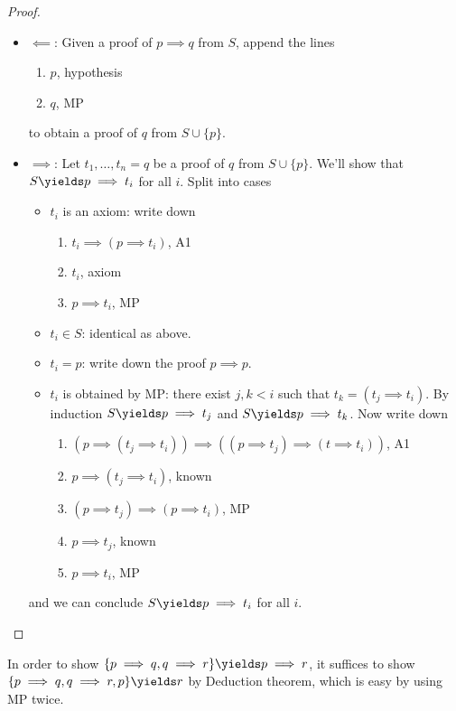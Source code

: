 \documentclass[a4paper]{article}
\begin{document}
\begin{proof}\leavevmode
  \begin{itemize}
  \item \(\impliedby\): Given a proof of \(p \implies q\) from \(S\), append the lines
    \begin{enumerate}
    \item \(p\), hypothesis
    \item \(q\), MP
    \end{enumerate}
    to obtain a proof of \(q\) from \(S \cup \{p\}\).
  \item \(\implies\): Let \(t_1, \dots, t_n = q\) be a proof of \(q\) from \(S \cup \{p\}\). We'll show that \(S \yields p \implies t_i\) for all \(i\). Split into cases
    \begin{itemize}
    \item \(t_i\) is an axiom: write down
      \begin{enumerate}
      \item \(t_i \implies (p \implies t_i)\), A1
      \item \(t_i\), axiom
      \item \(p \implies t_i\), MP
      \end{enumerate}
    \item \(t_i \in S\): identical as above.
    \item \(t_i = p\): write down the proof \(p \implies p\).
    \item \(t_i\) is obtained by MP: there exist \(j, k < i\) such that \(t_k = (t_j \implies t_i)\). By induction \(S \yields p \implies t_j\) and \(S \yields p \implies t_k\). Now write down
      \begin{enumerate}
      \item \((p \implies (t_j \implies t_i)) \implies ((p \implies t_j) \implies (t \implies t_i))\), A1
      \item \(p \implies (t_j \implies t_i)\), known
      \item \((p \implies t_j) \implies (p \implies t_i)\), MP
      \item \(p \implies t_j\), known
      \item \(p \implies t_i\), MP
      \end{enumerate}
    \end{itemize}
    and we can conclude \(S \yields p \implies t_i\) for all \(i\).
  \end{itemize}
\end{proof}

\begin{eg}
  In order to show \(\{p \implies q, q \implies r\} \yields p \implies r\), it suffices to show \(\{p \implies q, q \implies r, p\} \yields r\) by Deduction theorem, which is easy by using MP twice.
\end{eg}
\end{document}
